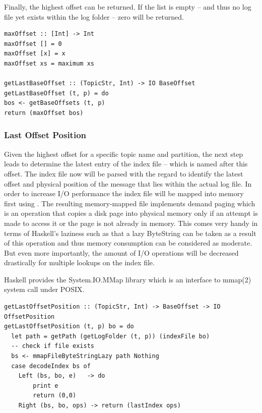 Finally, the highest offset can be returned. If the list is empty -- and thus no log file 
yet exists within the log folder -- zero will be returned.

\begin{lstlisting}
maxOffset :: [Int] -> Int
maxOffset [] = 0
maxOffset [x] = x
maxOffset xs = maximum xs

getLastBaseOffset :: (TopicStr, Int) -> IO BaseOffset
getLastBaseOffset (t, p) = do
bos <- getBaseOffsets (t, p)
return (maxOffset bos)
\end{lstlisting}

\subsubsection{Last Offset Position}

Given the highest offset for a specific topic name and partition, the next step
leads to determine the latest entry of the index file -- which is named after
this offset. The index file now will be parsed with the regard to identify the
latest offset and physical position of the message that lies within the actual
log file. In order to increase I/O performance the index file will be mapped
into memory first using
. The resulting
memory-mapped file implements demand paging which is an operation that copies a
disk page into physical memory only if an attempt is made to access it or the
page is not already in memory. This comes very handy in terms of Haskell's
laziness such as that a lazy ByteString can be taken as a result of this
operation and thus memory consumption can be considered as moderate. But even
more importantly, the amount of I/O operations will be decreased drastically
for multiple lookups on the index file.

Haskell provides the System.IO.MMap library which is an interface to mmap(2)
system call under POSIX. 


\begin{lstlisting}
getLastOffsetPosition :: (TopicStr, Int) -> BaseOffset -> IO OffsetPosition
getLastOffsetPosition (t, p) bo = do 
  let path = getPath (getLogFolder (t, p)) (indexFile bo)
  -- check if file exists
  bs <- mmapFileByteStringLazy path Nothing
  case decodeIndex bs of
    Left (bs, bo, e)   -> do
        print e
        return (0,0)
    Right (bs, bo, ops) -> return (lastIndex ops)
\end{lstlisting}


